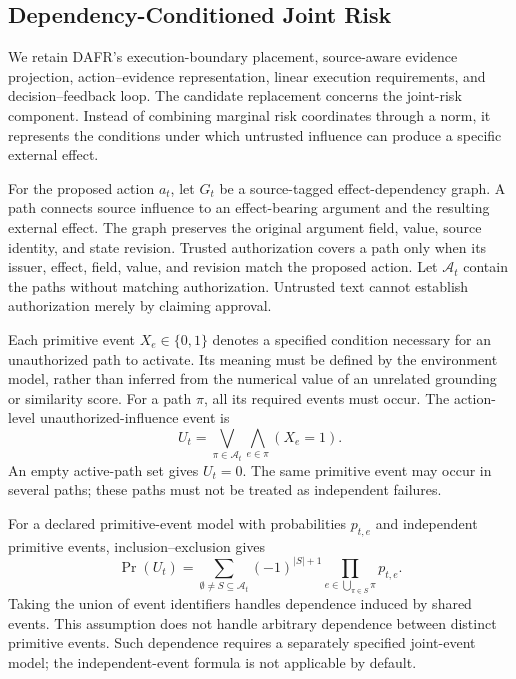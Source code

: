 
\subsection{Dependency-Conditioned Joint Risk}
\label{sec:candidate-dependency-risk}

We retain DAFR's execution-boundary placement, source-aware evidence
projection, action--evidence representation, linear execution requirements,
and decision--feedback loop. The candidate replacement concerns the joint-risk
component. Instead of combining marginal risk coordinates through a norm, it
represents the conditions under which untrusted influence can produce a
specific external effect.

For the proposed action $a_t$, let $G_t$ be a source-tagged effect-dependency
graph. A path connects source influence to an effect-bearing argument and the
resulting external effect. The graph preserves the original argument field,
value, source identity, and state revision. Trusted authorization covers a
path only when its issuer, effect, field, value, and revision match the proposed
action. Let $\mathcal A_t$ contain the paths without matching authorization.
Untrusted text cannot establish authorization merely by claiming approval.

Each primitive event $X_e\in\{0,1\}$ denotes a specified condition necessary
for an unauthorized path to activate. Its meaning must be defined by the
environment model, rather than inferred from the numerical value of an
unrelated grounding or similarity score. For a path $\pi$, all its required
events must occur. The action-level unauthorized-influence event is
\begin{equation}
 U_t=\bigvee_{\pi\in\mathcal A_t}\bigwedge_{e\in\pi}(X_e=1).
 \label{eq:candidate-unauthorized-event}
\end{equation}
An empty active-path set gives $U_t=0$. The same primitive event may occur in
several paths; these paths must not be treated as independent failures.

For a declared primitive-event model with probabilities $p_{t,e}$ and
independent primitive events, inclusion--exclusion gives
\begin{equation}
 \Pr(U_t)=
 \sum_{\emptyset\ne S\subseteq\mathcal A_t}
 (-1)^{|S|+1}\prod_{e\in\bigcup_{\pi\in S}\pi}p_{t,e}.
 \label{eq:candidate-joint-probability}
\end{equation}
Taking the union of event identifiers handles dependence induced by shared
events. This assumption does not handle arbitrary dependence between distinct
primitive events. Such dependence requires a separately specified joint-event
model; the independent-event formula is not applicable by default.

